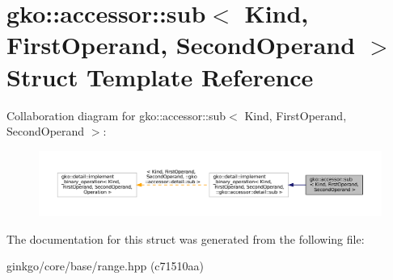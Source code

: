 \hypertarget{structgko_1_1accessor_1_1sub}{}\section{gko\+:\+:accessor\+:\+:sub$<$ Kind, First\+Operand, Second\+Operand $>$ Struct Template Reference}
\label{structgko_1_1accessor_1_1sub}


Collaboration diagram for gko\+:\+:accessor\+:\+:sub$<$ Kind, First\+Operand, Second\+Operand $>$\+:
\nopagebreak
\begin{figure}[H]
\begin{center}
\leavevmode
\includegraphics[width=350pt]{structgko_1_1accessor_1_1sub__coll__graph}
\end{center}
\end{figure}


The documentation for this struct was generated from the following file\+:\begin{DoxyCompactItemize}
\item 
ginkgo/core/base/range.\+hpp (c71510aa)\end{DoxyCompactItemize}
